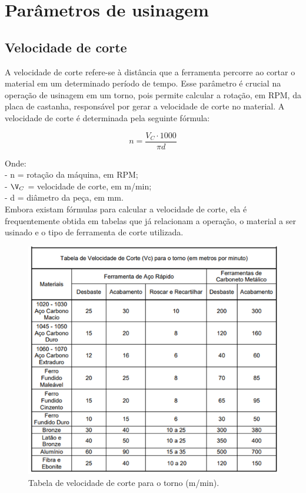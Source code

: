 
\section{Parâmetros de usinagem}

\subsection{Velocidade de corte}

A velocidade de corte refere-se à distância que a ferramenta percorre ao cortar o material em um determinado período de tempo. Esse parâmetro é crucial na operação de usinagem em um torno, pois permite calcular a rotação, em RPM, da placa de castanha, responsável por gerar a velocidade de corte no material. A velocidade de corte é determinada pela seguinte fórmula:

\begin{equation}
n=\frac{V_{C} \cdot 1000}{\pi d}    
\end{equation}

Onde: \\
- n  = rotação da máquina, em RPM; \\
- $\V_{C}$ = velocidade de corte, em m/min; \\
- d = diâmetro da peça, em mm. \\

Embora existam fórmulas para calcular a velocidade de corte, ela é frequentemente obtida em tabelas que já relacionam a operação, o material a ser usinado e o tipo de ferramenta de corte utilizada.

\begin{figure}[h!]
    \centering
    \includegraphics[width=0.7\linewidth]{images/vc_torno.png}
    \caption{Tabela de velocidade de corte para o torno (m/min).}
    \label{fig:enter-label}
\end{figure}

